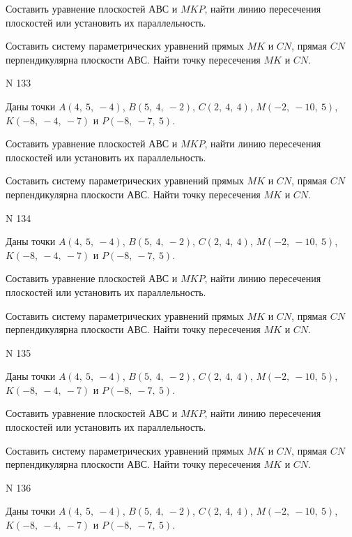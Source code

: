 \documentclass[11pt]{report}
\begin{document}
Составить уравнение плоскостей $АВС$ и $MKP$,
найти линию пересечения плоскостей или установить их параллельность.

Составить систему параметрических уравнений прямых $MK$ и $CN$,
прямая $CN$ перпендикулярна плоскости $АВС$. 
Найти точку пересечения $MK$ и $CN$.



 N 133

Даны точки $A\left( 4, \  5, \  -4\right)$, $B\left( 5, \  4, \  -2\right)$, $C\left( 2, \  4, \  4\right)$, $M\left( -2, \  -10, \  5\right)$, $K\left( -8, \  -4, \  -7\right)$ и $P\left( -8, \  -7, \  5\right)$.


Составить уравнение плоскостей $АВС$ и $MKP$,
найти линию пересечения плоскостей или установить их параллельность.

Составить систему параметрических уравнений прямых $MK$ и $CN$,
прямая $CN$ перпендикулярна плоскости $АВС$. 
Найти точку пересечения $MK$ и $CN$.



 N 134

Даны точки $A\left( 4, \  5, \  -4\right)$, $B\left( 5, \  4, \  -2\right)$, $C\left( 2, \  4, \  4\right)$, $M\left( -2, \  -10, \  5\right)$, $K\left( -8, \  -4, \  -7\right)$ и $P\left( -8, \  -7, \  5\right)$.


Составить уравнение плоскостей $АВС$ и $MKP$,
найти линию пересечения плоскостей или установить их параллельность.

Составить систему параметрических уравнений прямых $MK$ и $CN$,
прямая $CN$ перпендикулярна плоскости $АВС$. 
Найти точку пересечения $MK$ и $CN$.



 N 135

Даны точки $A\left( 4, \  5, \  -4\right)$, $B\left( 5, \  4, \  -2\right)$, $C\left( 2, \  4, \  4\right)$, $M\left( -2, \  -10, \  5\right)$, $K\left( -8, \  -4, \  -7\right)$ и $P\left( -8, \  -7, \  5\right)$.


Составить уравнение плоскостей $АВС$ и $MKP$,
найти линию пересечения плоскостей или установить их параллельность.

Составить систему параметрических уравнений прямых $MK$ и $CN$,
прямая $CN$ перпендикулярна плоскости $АВС$. 
Найти точку пересечения $MK$ и $CN$.



 N 136

Даны точки $A\left( 4, \  5, \  -4\right)$, $B\left( 5, \  4, \  -2\right)$, $C\left( 2, \  4, \  4\right)$, $M\left( -2, \  -10, \  5\right)$, $K\left( -8, \  -4, \  -7\right)$ и $P\left( -8, \  -7, \  5\right)$.
\end{document}

